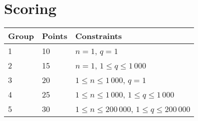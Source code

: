 \section*{Scoring}
\begin{tabular}{|l|l|l|}
\hline
Group & Points & Constraints \\ \hline
1     & 10   & $n = 1$, $q = 1$ \\ \hline
2     & 15   & $n = 1$, $1 \leq q \leq 1\,000$ \\ \hline
3     & 20   & $1 \leq n \leq 1\,000$, $q = 1$ \\ \hline
4     & 25   & $1 \leq n \leq 1\,000$, $1 \leq q \leq 1\,000$ \\ \hline
5     & 30   & $1 \leq n \leq 200\,000$, $1 \leq q \leq 200\,000$ \\ \hline
\end{tabular}
